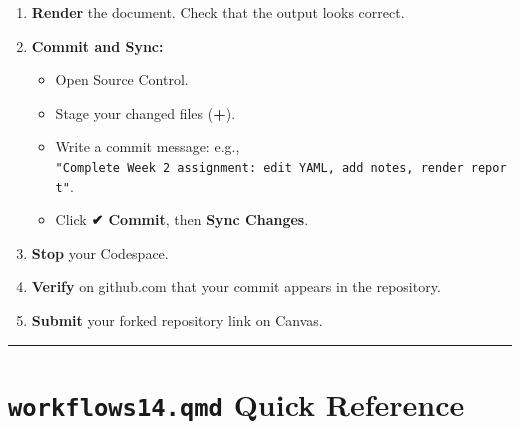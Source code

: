 \documentclass[
  letterpaper,
  DIV=11,
  numbers=noendperiod,
  oneside]{scrreprt}
\providecommand{\tightlist}{%
  \setlength{\itemsep}{0pt}\setlength{\parskip}{0pt}}
\begin{document}
\begin{enumerate}
\def\labelenumi{\arabic{enumi}.}
\setcounter{enumi}{4}
\tightlist
\item
  \textbf{Render} the document. Check that the output looks correct.
\item
  \textbf{Commit and Sync:}

  \begin{itemize}
  \tightlist
  \item
    Open Source Control.
  \item
    Stage your changed files (\textbf{+}).
  \item
    Write a commit message: e.g.,
    \texttt{"Complete\ Week\ 2\ assignment:\ edit\ YAML,\ add\ notes,\ render\ report"}.
  \item
    Click \textbf{✔ Commit}, then \textbf{Sync Changes}.
  \end{itemize}
\item
  \textbf{Stop} your Codespace.
\item
  \textbf{Verify} on github.com that your commit appears in the
  repository.
\item
  \textbf{Submit} your forked repository link on Canvas.
\end{enumerate}

\begin{center}\rule{0.5\linewidth}{0.5pt}\end{center}

\section*{\texorpdfstring{\texttt{workflows14.qmd} Quick
Reference}{workflows14.qmd Quick Reference}}\label{workflows14.qmd-quick-reference}

\end{document}
